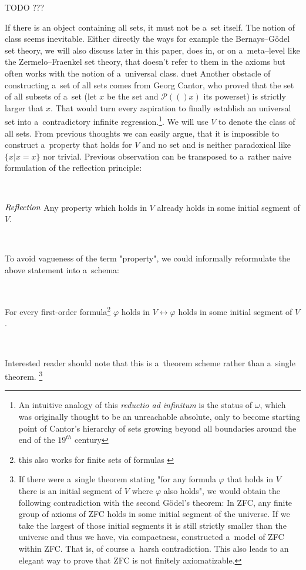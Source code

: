 \documentclass[12pt,a4paper]{article}
\newcommand{\power}[1]{\ensuremath{\mathscr{P}} (#1)}
\renewcommand{\iff}{\leftrightarrow}
\begin{document}
TODO ???

If there is an object containing all sets, it must not be a~set itself. The notion of class seems inevitable. Either directly the ways for example the Bernays–Gödel set theory, we will also discuss later in this paper, does in, or on a~meta–level like the Zermelo–Fraenkel set theory, that doesn't refer to them in the axioms but often works with the notion of a~universal class.
duet
Another obstacle of constructing a~set of all sets comes from Georg Cantor, who proved that the set of all subsets of a~set (let $x$ be the set and $\power (x)$ its powerset) is strictly larger that $x$. That would turn every aspiration to finally establish an universal set into a~contradictory infinite regression.\footnote{An intuitive analogy of this \emph{reductio ad infinitum} is the status of $\omega$, which was originally thought to be an unreachable absolute, only to become starting point of Cantor's hierarchy of sets growing beyond all boundaries around the end of the $19^{th}$ century}. We will use $V$ to denote the class of all sets. %
From previous thoughts we can easily argue, that it is impossible to construct a~property that holds for $V$ and no set and is neither paradoxical like $\{x  |  x = x\}$ nor trivial. Previous observation can be transposed to a~rather naive formulation of the reflection principle:


\

$\emph{Reflection}$ Any property which holds in $V$ already holds in some initial segment of $V$. 

\

To avoid vagueness of the term "property", we could informally reformulate the above statement into a~schema: 

\

For every first-order formula\footnote{this also works for finite sets of formulas \cite[p.~168]{JechBook}} $\varphi$ holds in $V \iff \varphi$ holds in some initial segment of $V$.

\

Interested reader should note that this is a~theorem scheme rather than a~single theorem. \footnote{If there were a~single theorem stating "for any formula $\varphi$ that holds in $V$ there is an initial segment of $V$ where $\varphi$ also holds", we would obtain the following contradiction with the second G{\"o}del's theorem: In ZFC, any finite group of axioms of ZFC holds in some initial segment of the universe. If we take the largest of those initial segments it is still strictly smaller than the universe and thus we have, via compactness, constructed a~model of ZFC within ZFC. That is, of course a~harsh contradiction. This also leads to an elegant way to prove that ZFC is not finitely axiomatizable.}
\end{document}
